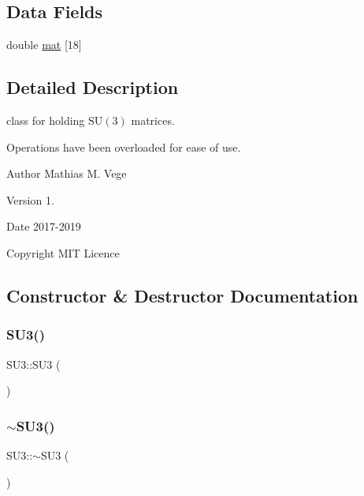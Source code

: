 \subsection*{Data Fields}
\begin{DoxyCompactItemize}
\item 
double \mbox{\hyperlink{class_s_u3_af003668305abe616f56568a075434be0}{mat}} \mbox{[}18\mbox{]}
\end{DoxyCompactItemize}


\subsection{Detailed Description}
class for holding $\mathrm{SU}(3)$ matrices. 

Operations have been overloaded for ease of use.

\begin{DoxyAuthor}{Author}
Mathias M. Vege 
\end{DoxyAuthor}
\begin{DoxyVersion}{Version}
1. 
\end{DoxyVersion}
\begin{DoxyDate}{Date}
2017-\/2019 
\end{DoxyDate}
\begin{DoxyCopyright}{Copyright}
M\+IT Licence 
\end{DoxyCopyright}


\subsection{Constructor \& Destructor Documentation}
\mbox{\label{class_s_u3_a79a4b45ff8cbe77f1f90a108971f822d}} 
\subsubsection{\texorpdfstring{SU3()}{SU3()}}
{\footnotesize\ttfamily S\+U3\+::\+S\+U3 (\begin{DoxyParamCaption}{ }\end{DoxyParamCaption})\hspace{0.3cm}{\ttfamily [inline]}}

\mbox{\label{class_s_u3_af1e314363e80a0404023494937c56afa}} 
\subsubsection{\texorpdfstring{$\sim$SU3()}{~SU3()}}
{\footnotesize\ttfamily S\+U3\+::$\sim$\+S\+U3 (\begin{DoxyParamCaption}{ }\end{DoxyParamCaption})\hspace{0.3cm}{\ttfamily [inline]}}



